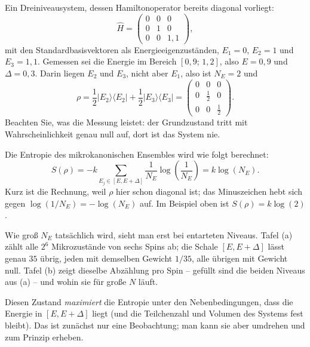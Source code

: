 \begin{beispiel}
  Ein Dreiniveausystem, dessen Hamiltonoperator bereits diagonal vorliegt:
  \begin{equation}
    \widehat{H} = \begin{pmatrix} 0 & 0 & 0\\ 0 & 1 & 0\\ 0 & 0 & 1{,}1\end{pmatrix},
  \end{equation}
  mit den Standardbasisvektoren als Energieeigenzuständen, $E_1 = 0$, $E_2 = 1$ und $E_3 = 1{,}1$. Gemessen sei die Energie im Bereich $[0{,}9;\, 1{,}2]$, also $E = 0{,}9$ und $\Delta = 0{,}3$. Darin liegen $E_2$ und $E_3$, nicht aber $E_1$, also ist $N_E = 2$ und
  \begin{equation}
    \rho = \frac{1}{2}|E_2\rangle\langle E_2| + \frac{1}{2}|E_3\rangle\langle E_3|
         = \begin{pmatrix} 0 & 0 & 0\\ 0 & \frac{1}{2} & 0\\ 0 & 0 & \frac{1}{2}\end{pmatrix}.
  \end{equation}
  Beachten Sie, was die Messung leistet: der Grundzustand tritt mit Wahrscheinlichkeit genau null auf, dort ist das System nie.
\end{beispiel}

Die Entropie des mikrokanonischen Ensembles wird wie folgt berechnet:
\begin{equation}
  S(\rho) = -k\sum_{E_j\in [E,E+\Delta]} \frac{1}{N_E} \log\left(\frac{1}{N_E}\right) = k \log(N_E).
\end{equation}
Kurz ist die Rechnung, weil $\rho$ hier schon diagonal ist; das Minuszeichen hebt sich gegen $\log(1/N_E) = -\log(N_E)$ auf. Im Beispiel oben ist $S(\rho) = k\log(2)$.



Wie groß $N_E$ tatsächlich wird, sieht man erst bei entarteten Niveaus. Tafel (a) zählt alle $2^6$ Mikrozustände von sechs Spins ab; die Schale $[E,E+\Delta]$ lässt genau $35$ übrig, jeden mit demselben Gewicht $1/35$, alle übrigen mit Gewicht null. Tafel (b) zeigt dieselbe Abzählung pro Spin -- gefüllt sind die beiden Niveaus aus (a) -- und wohin sie für große $N$ läuft.

Diesen Zustand \emph{maximiert} die Entropie unter den Nebenbedingungen, dass die Energie in $[E,E+\Delta]$ liegt (und die Teilchenzahl und Volumen des Systems fest bleibt). Das ist zunächst nur eine Beobachtung; man kann sie aber umdrehen und zum Prinzip erheben.

